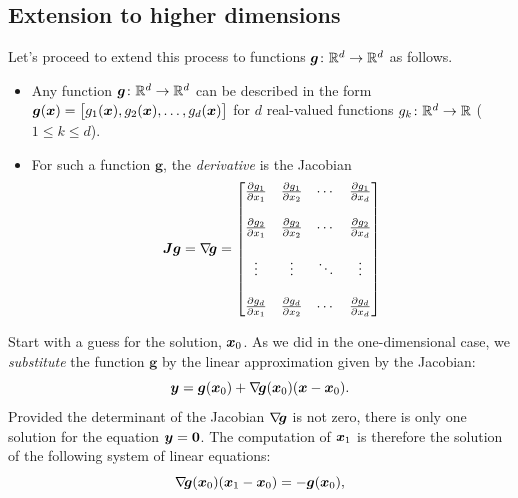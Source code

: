 \subsection{Extension to higher dimensions}

Let's proceed to extend this process to functions $\boldsymbol{g} \colon \mathbb{R}^d \to \mathbb{R}^d$ as follows.
\begin{itemize}
	\item Any function $\boldsymbol{g} \colon \mathbb{R}^d \to \mathbb{R}^d$ can be described in the form $\boldsymbol{g}(\boldsymbol{x}) = \big[ g_1(\boldsymbol{x}), g_2(\boldsymbol{x}), \dotsc, g_d(\boldsymbol{x}) \big]$ for $d$ real-valued functions $g_k\colon \mathbb{R}^d \to \mathbb{R}$ ($1\leq k \leq d$).
	\item For such a function $\boldsymbol{g}$, the \emph{derivative} is the Jacobian
	\begin{equation*}
	\boldsymbol{J} \boldsymbol{g} = \mathop{\nabla\! {\boldsymbol{g}}} = \begin{bmatrix}
	\frac{\partial g_1}{\partial x_1} & \frac{\partial g_1}{\partial x_2} & \dotsb & \frac{\partial g_1}{\partial x_d} \\ \\
	\frac{\partial g_2}{\partial x_1} & \frac{\partial g_2}{\partial x_2} & \dotsb & \frac{\partial g_2}{\partial x_d} \\ \\
	\vdots & \vdots & \ddots & \vdots \\ \\
	\frac{\partial g_d}{\partial x_1} & \frac{\partial g_d}{\partial x_2} & \dotsb & \frac{\partial g_d}{\partial x_d} \\
	\end{bmatrix}
	\end{equation*}
\end{itemize}
Start with a guess for the solution, $\boldsymbol{x}_0$.  As we did in the one-dimensional case, we \emph{substitute} the function $\boldsymbol{g}$ by the linear approximation given by the Jacobian:
\begin{equation*}
\boldsymbol{y} = \boldsymbol{g}(\boldsymbol{x}_0)+ \mathop{\nabla\! {\boldsymbol{g}}}(\boldsymbol{x}_0)(\boldsymbol{x} - \boldsymbol{x}_0).
\end{equation*}
Provided the determinant of the Jacobian $\mathop{\nabla\! {\boldsymbol{g}}}$ is not zero, there is only one solution for the equation $\boldsymbol{y} = \boldsymbol{0}$.
 The computation of $\boldsymbol{x}_1$ is therefore the solution of the following system of linear equations:
\begin{equation*}
\mathop{\nabla\! {\boldsymbol{g}}}(\boldsymbol{x}_0)(\boldsymbol{x}_1-\boldsymbol{x}_0) = -\boldsymbol{g}(\boldsymbol{x}_0), 
\end{equation*}
